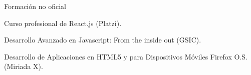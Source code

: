 \begin{cventries}

\cventry
{Formación no oficial} %
{} %
{} %
{} %
{ %
\begin{cvitems}
\item {Curso profesional de React.js (Platzi).}
\item {Desarrollo Avanzado en Javascript: From the inside out (GSIC).}
\item {Desarrollo de Aplicaciones en HTML5 y para Dispositivos Móviles Firefox O.S. (Miriada X).}
\end{cvitems}
}

\end{cventries}